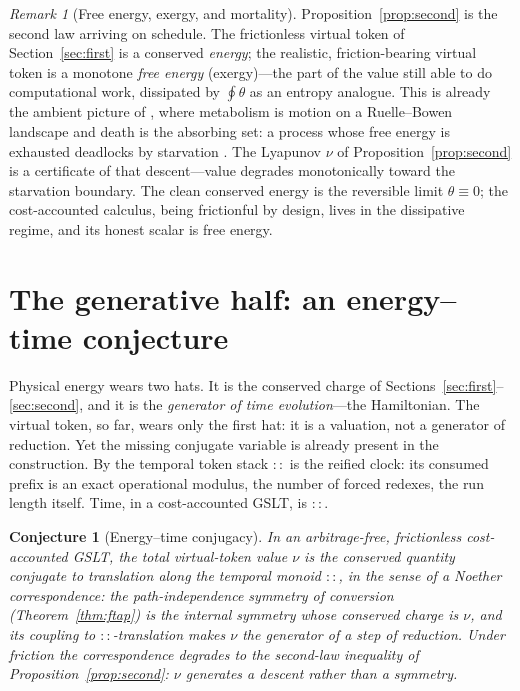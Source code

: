 \documentclass[11pt]{article}
\theoremstyle{definition}
\theoremstyle{plain}
\newtheorem{conjecture}[definition]{Conjecture}
\theoremstyle{remark}
\newtheorem{remark}[definition]{Remark}
\begin{document}
\begin{remark}[Free energy, exergy, and mortality]
Proposition~\ref{prop:second} is the second law arriving on schedule. The frictionless virtual
token of Section~\ref{sec:first} is a conserved \emph{energy}; the realistic, friction-bearing
virtual token is a monotone \emph{free energy} (exergy)---the part of the value still able to do
computational work, dissipated by $\oint\theta$ as an entropy analogue. This is already the ambient
picture of \cite{MC}, where metabolism is motion on a Ruelle--Bowen landscape and death is the
absorbing set: a process whose free energy is exhausted deadlocks by starvation
\cite[Def.~1]{MC}. The Lyapunov $\nu$ of Proposition~\ref{prop:second} is a certificate of that
descent---value degrades monotonically toward the starvation boundary. The clean conserved energy
is the reversible limit $\theta\equiv 0$; the cost-accounted calculus, being frictionful by
design, lives in the dissipative regime, and its honest scalar is free energy.
\end{remark}

\section{The generative half: an energy--time conjecture}
\label{sec:conjugacy}

Physical energy wears two hats. It is the conserved charge of Sections~\ref{sec:first}--\ref{sec:second}, and it is the
\emph{generator of time evolution}---the Hamiltonian. The virtual token, so far, wears only the
first hat: it is a valuation, not a generator of reduction. Yet the missing conjugate variable is
already present in the construction. By \cite[Prop.~4.1]{CE} the temporal token stack $::$ is the
reified clock: its consumed prefix is an exact operational modulus, the number of forced redexes,
the run length itself. Time, in a cost-accounted GSLT, is $::$.

\begin{conjecture}[Energy--time conjugacy]\label{conj:conjugacy}
In an arbitrage-free, frictionless cost-accounted GSLT, the total virtual-token value $\nu$ is the
conserved quantity \emph{conjugate to translation along the temporal monoid} $::$, in the sense of
a Noether \cite{Noether} correspondence: the path-independence symmetry of conversion
(Theorem~\ref{thm:ftap}) is the internal symmetry whose conserved charge is $\nu$, and its coupling
to $::$-translation makes $\nu$ the generator of a step of reduction. Under friction the
correspondence degrades to the second-law inequality of Proposition~\ref{prop:second}: $\nu$
generates a \emph{descent} rather than a symmetry.
\end{conjecture}
\end{document}
